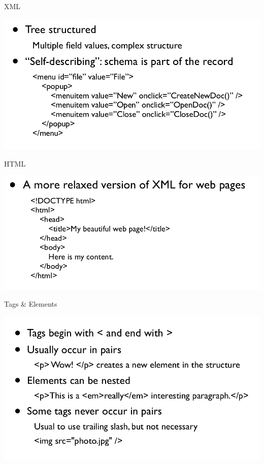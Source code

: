 \documentclass{beamer}
\begin{document}
\begin{frame}{XML}
    \begin{center}
        \includegraphics[scale=0.3]{xml.png}
    \end{center}
\end{frame}
\begin{frame}{HTML}
    \begin{center}
        \includegraphics[scale=0.3]{html.png}
    \end{center}
\end{frame}
\begin{frame}{Tags \& Elements}
    \begin{center}
        \includegraphics[scale=0.3]{tagsAndElems.png}
    \end{center}
\end{frame}
\end{document}
